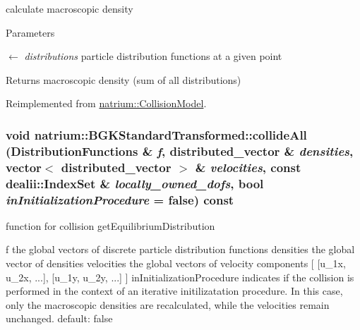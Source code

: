 calculate macroscopic density 
\begin{DoxyParams}{Parameters}
\item[\mbox{$\leftarrow$} {\em distributions}]particle distribution functions at a given point \end{DoxyParams}
\begin{DoxyReturn}{Returns}
macroscopic density (sum of all distributions) 
\end{DoxyReturn}


Reimplemented from \hyperlink{classnatrium_1_1CollisionModel_ae1c879c87ac210a227a8e3da2d0ac385}{natrium::CollisionModel}.\hypertarget{classnatrium_1_1BGKStandardTransformed_aaa2e752c6aa2294f1ebeb9d326ba9eb8}{
\subsubsection[{collideAll}]{\setlength{\rightskip}{0pt plus 5cm}void natrium::BGKStandardTransformed::collideAll ({\bf DistributionFunctions} \& {\em f}, \/  {\bf distributed\_\-vector} \& {\em densities}, \/  vector$<$ {\bf distributed\_\-vector} $>$ \& {\em velocities}, \/  const dealii::IndexSet \& {\em locally\_\-owned\_\-dofs}, \/  bool {\em inInitializationProcedure} = {\ttfamily false}) const}}
\label{classnatrium_1_1BGKStandardTransformed_aaa2e752c6aa2294f1ebeb9d326ba9eb8}


function for collision getEquilibriumDistribution

f the global vectors of discrete particle distribution functions densities the global vector of densities velocities the global vectors of velocity components \mbox{[} \mbox{[}u\_\-1x, u\_\-2x, ...\mbox{]}, \mbox{[}u\_\-1y, u\_\-2y, ...\mbox{]} \mbox{]} inInitializationProcedure indicates if the collision is performed in the context of an iterative initilizatation procedure. In this case, only the macroscopic densities are recalculated, while the velocities remain unchanged. default: false 

